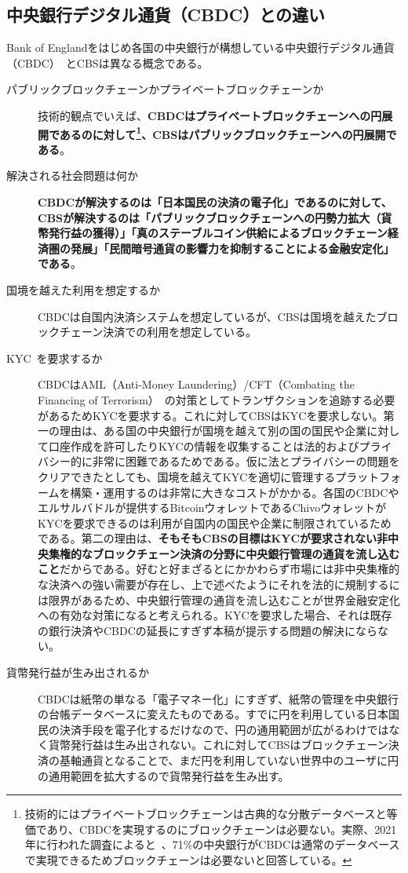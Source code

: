 \documentclass[dvipdfmx,a4paper]{jsarticle}
\begin{document}
\subsection{中央銀行デジタル通貨（CBDC）との違い}

Bank of Englandをはじめ各国の中央銀行が構想している中央銀行デジタル通貨（CBDC）~\cite{cbdc1,cbdc2}とCBSは異なる概念である。

\begin{description}
\item[パブリックブロックチェーンかプライベートブロックチェーンか] 技術的観点でいえば、\textbf{CBDCはプライベートブロックチェーンへの円展開であるのに対して\footnote{技術的にはプライベートブロックチェーンは古典的な分散データベースと等価であり、CBDCを実現するのにブロックチェーンは必要ない。実際、2021年に行われた調査によると~\cite{ubssurvey}、71\%の中央銀行がCBDCは通常のデータベースで実現できるためブロックチェーンは必要ないと回答している。}、CBSはパブリックブロックチェーンへの円展開である}。
\item[解決される社会問題は何か] \textbf{CBDCが解決するのは「日本国民の決済の電子化」であるのに対して、CBSが解決するのは「パブリックブロックチェーンへの円勢力拡大（貨幣発行益の獲得）」「真のステーブルコイン供給によるブロックチェーン経済圏の発展」「民間暗号通貨の影響力を抑制することによる金融安定化」である}。
\item[国境を越えた利用を想定するか] CBDCは自国内決済システムを想定しているが、CBSは国境を越えたブロックチェーン決済での利用を想定している。
\item[KYC~\cite{parra2017kyc}を要求するか] CBDCはAML（Anti-Money Laundering）/CFT（Combating the Financing of Terrorism）~\cite{verdugo2011compliance}の対策としてトランザクションを追跡する必要があるためKYCを要求する。これに対してCBSはKYCを要求しない。第一の理由は、ある国の中央銀行が国境を越えて別の国の国民や企業に対して口座作成を許可したりKYCの情報を収集することは法的およびプライバシー的に非常に困難であるためである。仮に法とプライバシーの問題をクリアできたとしても、国境を越えてKYCを適切に管理するプラットフォームを構築・運用するのは非常に大きなコストがかかる。各国のCBDCやエルサルバドルが提供するBitcoinウォレットであるChivoウォレットがKYCを要求できるのは利用が自国内の国民や企業に制限されているためである。第二の理由は、\textbf{そもそもCBSの目標はKYCが要求されない非中央集権的なブロックチェーン決済の分野に中央銀行管理の通貨を流し込むこと}だからである。好むと好まざるとにかかわらず市場には非中央集権的な決済への強い需要が存在し、上で述べたようにそれを法的に規制するには限界があるため、中央銀行管理の通貨を流し込むことが世界金融安定化への有効な対策になると考えられる。KYCを要求した場合、それは既存の銀行決済やCBDCの延長にすぎず本稿が提示する問題の解決にならない。
\item[貨幣発行益が生み出されるか] CBDCは紙幣の単なる「電子マネー化」にすぎず、紙幣の管理を中央銀行の台帳データベースに変えたものである。すでに円を利用している日本国民の決済手段を電子化するだけなので、円の通用範囲が広がるわけではなく貨幣発行益は生み出されない。これに対してCBSはブロックチェーン決済の基軸通貨となることで、まだ円を利用していない世界中のユーザに円の通用範囲を拡大するので貨幣発行益を生み出す。
\end{description}
\end{document}
